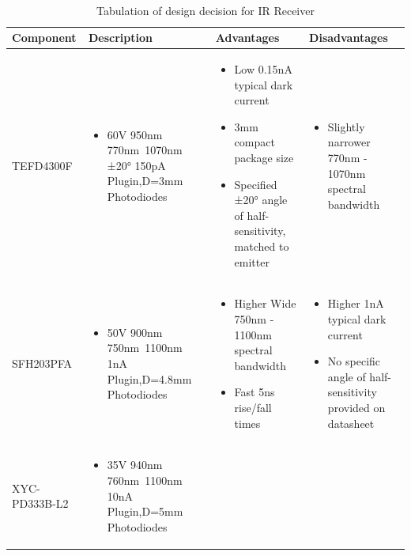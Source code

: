 \documentclass[class=report,11pt,crop=false]{standalone}
\begin{document}
\\
\begin{table}[h]
  \begin{center}
    \caption{Tabulation of design decision for IR Receiver}
    \label{tab:IR emitters}
    \begin{tabular}{|>{\centering\arraybackslash}m{2cm}|m{3.5cm}|m{5cm}|m{6.5cm}|}
      \hline
      \textbf{Component} & \textbf{Description} & \textbf{Advantages} & \textbf{Disadvantages}\\   
      \hline
      TEFD4300F & 
      \begin{itemize}
      \item 60V 950nm 770nm~1070nm ±20° 150pA Plugin,D=3mm Photodiodes
      
      \end{itemize} &
      \begin{itemize}
      \item Low 0.15nA typical dark current 
      \item 3mm compact package size
      \item Specified ±20° angle of half-sensitivity, matched to emitter 
      
      \end{itemize} &
      \begin{itemize}
      \item Slightly narrower 770nm - 1070nm spectral bandwidth
      \end{itemize}
      \\
      \hline
      SFH203PFA  & 
      \begin{itemize}
      \item 50V 900nm 750nm~1100nm 1nA Plugin,D=4.8mm Photodiodes
      \end{itemize} &
      \begin{itemize}
            \item Higher Wide 750nm - 1100nm spectral bandwidth 
      \item Fast 5ns rise/fall times
     
      \end{itemize} &  
      \begin{itemize}
     \item Higher 1nA typical dark current 
      \item No specific angle of half-sensitivity provided on datasheet 
      \end{itemize}
      \\
      \hline  
      XYC-PD333B-L2 & 
      \begin{itemize}
      \item 35V 940nm 760nm~1100nm 10nA Plugin,D=5mm Photodiodes 
 

\end{itemize}
\end{tabular}
\end{center}
\end{table}
\end{document}
